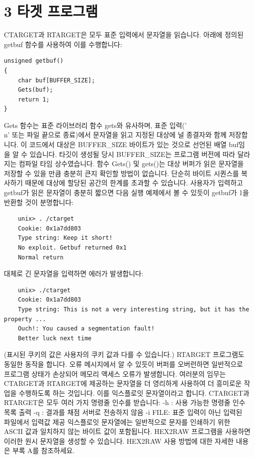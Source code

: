 \documentclass[10pt]{article}
\begin{document}
\section*{3 타겟 프로그램}
CTARGET과 RTARGET은 모두 표준 입력에서 문자열을 읽습니다. 아래에 정의된 getbuf 함수를 사용하여 이를 수행합니다:

\begin{verbatim}
unsigned getbuf()
{  
    char buf[BUFFER_SIZE];
    Gets(buf);
    return 1;
}
\end{verbatim}
\noindent
Gets 함수는 표준 라이브러리 함수 gets와 유사하며, 표준 입력('\\n' 또는 파일 끝으로 종료)에서 문자열을 읽고 지정된 대상에 널 종결자와 함께 저장합니다. 이 코드에서 대상은 BUFFER\_SIZE 바이트가 있는 것으로 선언된 배열 buf임을 알 수 있습니다. 타깃이 생성될 당시 BUFFER\_SIZE는 프로그램 버전에 따라 달라지는 컴파일 타임 상수였습니다.
\noindent
함수 Gets() 및 gets()는 대상 버퍼가 읽은 문자열을 저장할 수 있을 만큼 충분히 큰지 확인할 방법이 없습니다. 단순히 바이트 시퀀스를 복사하기 때문에 대상에 할당된 공간의 한계를 초과할 수 있습니다.
\noindent
사용자가 입력하고 getbuf가 읽은 문자열이 충분히 짧으면 다음 실행 예제에서 볼 수 있듯이 getbuf가 1을 반환할 것이 분명합니다:

\begin{verbatim}
    unix> . /ctarget
    Cookie: 0x1a7dd803
    Type string: Keep it short!
    No exploit. Getbuf returned 0x1
    Normal return
\end{verbatim}
\noindent
대체로 긴 문자열을 입력하면 에러가 발생합니다:

\begin{verbatim}
    unix> ./ctarget
    Cookie: 0x1a7dd803
    Type string: This is not a very interesting string, but it has the property ...
    Ouch!: You caused a segmentation fault!
    Better luck next time
\end{verbatim}
\noindent
(표시된 쿠키의 값은 사용자의 쿠키 값과 다를 수 있습니다.) RTARGET 프로그램도 동일한 동작을 합니다. 오류 메시지에서 알 수 있듯이 버퍼를 오버런하면 일반적으로 프로그램 상태가 손상되어 메모리 액세스 오류가 발생합니다. 여러분의 임무는 CTARGET과 RTARGET에 제공하는 문자열을 더 영리하게 사용하여 더 흥미로운 작업을 수행하도록 하는 것입니다. 이를 익스플로잇 문자열이라고 합니다.
\noindent
CTARGET과 RTARGET은 모두 여러 가지 명령줄 인수를 받습니다:
\noindent
-h : 사용 가능한 명령줄 인수 목록 출력
\noindent
-q : 결과를 채점 서버로 전송하지 않음
\noindent
-i FILE: 표준 입력이 아닌 입력된 파일에서 입력값 제공
\noindent
익스플로잇 문자열에는 일반적으로 문자를 인쇄하기 위한 ASCII 값과 일치하지 않는 바이트 값이 포함됩니다. HEX2RAW 프로그램을 사용하면 이러한 원시 문자열을 생성할 수 있습니다. HEX2RAW 사용 방법에 대한 자세한 내용은 부록 A를 참조하세요.
\end{document}
